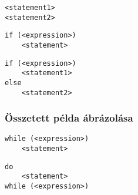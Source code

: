 \begin{minipage}{\balhasab}
\begin{lstlisting}
<statement1>
<statement2>
\end{lstlisting}
\end{minipage}
\begin{minipage}{\jobbhasab}
\end{minipage}



\begin{minipage}{\balhasab}
\begin{lstlisting}
if (<expression>)
	<statement>
\end{lstlisting}
\end{minipage}
\begin{minipage}{\jobbhasab}
\end{minipage}



\begin{minipage}{\balhasab}
\begin{lstlisting}
if (<expression>)
	<statement1>
else
	<statement2>
\end{lstlisting}
\end{minipage}
\begin{minipage}{\jobbhasab}
\end{minipage}

\subsubsection{Összetett példa ábrázolása}

\begin{minipage}{\balhasab}
\begin{lstlisting}
while (<expression>)
	<statement>
\end{lstlisting}
\end{minipage}
\begin{minipage}{\jobbhasab}
\end{minipage}



\begin{minipage}{\balhasab}
\begin{lstlisting}
do
	<statement>
while (<expression>)
\end{lstlisting}
\end{minipage}
\begin{minipage}{\jobbhasab}
\end{minipage}



